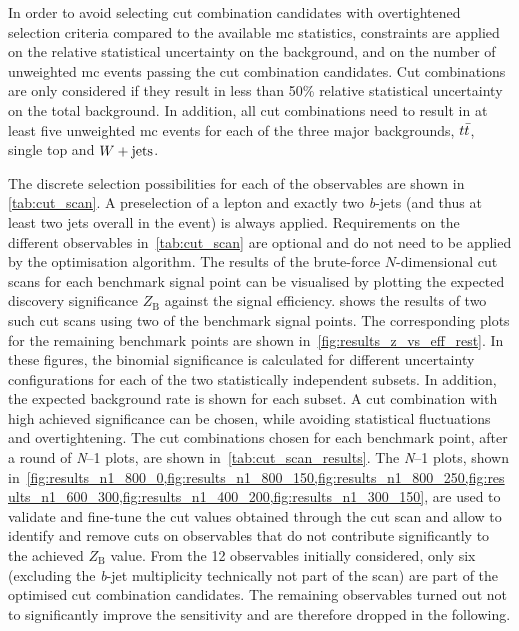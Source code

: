 In order to avoid selecting cut combination candidates with overtightened selection criteria compared to the available \gls{mc} statistics, constraints are applied on the relative statistical uncertainty on the background, and on the number of unweighted \gls{mc} events passing the cut combination candidates.
Cut combinations are only considered if they result in less than 50\% relative statistical uncertainty on the total background.
In addition, all cut combinations need to result in at least five unweighted \gls{mc} events for each of the three major backgrounds, $t\bar{t}$, single top and $W+\mathrm{jets}$.

The discrete selection possibilities for each of the observables are shown in \cref{tab:cut_scan}.
A preselection of a lepton and exactly two \textit{b}-jets (and thus at least two jets overall in the event) is always applied. Requirements on the different observables in~\cref{tab:cut_scan} are optional and do not need to be applied by the optimisation algorithm.
The results of the brute-force $N$-dimensional cut scans for each benchmark signal point can be visualised by plotting the expected discovery significance $Z_\mathrm{B}$ against the signal efficiency.
 shows the results of two such cut scans using two of the benchmark signal points.
The corresponding plots for the remaining benchmark points are shown in~\cref{fig:results_z_vs_eff_rest}. In these figures, the binomial significance is calculated for different uncertainty configurations for each of the two statistically independent subsets.
In addition, the expected background rate is shown for each subset.
A cut combination with high achieved significance can be chosen, while avoiding statistical fluctuations and overtightening.
The cut combinations chosen for each benchmark point, after a round of \textit{N}--1 plots, are shown in~\cref{tab:cut_scan_results}. The \textit{N}--1 plots, shown in~\cref{fig:results_n1_800_0,fig:results_n1_800_150,fig:results_n1_800_250,fig:results_n1_600_300,fig:results_n1_400_200,fig:results_n1_300_150}, are used to validate and fine-tune the cut values obtained through the cut scan and allow to identify and remove cuts on observables that do not contribute significantly to the achieved $Z_\mathrm{B}$ value.
From the 12 observables initially considered, only six (excluding the \textit{b}-jet multiplicity technically not part of the scan) are part of the optimised cut combination candidates.
The remaining observables turned out not to significantly improve the sensitivity and are therefore dropped in the following.


